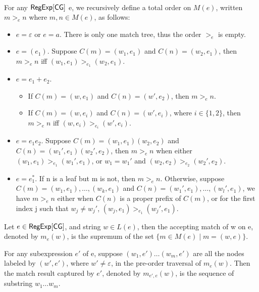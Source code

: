 \begin{definition}
	\
	
	For any ${\sf RegExp}[\sf CG]$ e, we recursively define a total order on $M (e)$, written $m
	>_e n$ where $m, n \in M (e)$, as follows:
	\begin{itemize}
		\item $e = \varepsilon$ or $e = a$. There is only one match tree, thus the
		order $>_e$ is empty.
		
		\item $e = (e_1)$. Suppose $C (m) = (w_1, e_1)$ and $C (n) = (w_2, e_1)$,
		then $m >_e n$ iff $(w_1, e_1) >_{e_1} (w_2, e_1)$.
		
		\item $e = e_1 + e_2$.
		\begin{itemize}
			\item If $C (m) = (w, e_1)$ and $C (n) = (w', e_2)$, then $m >_e n$.
			
			\item If $C (m) = (w, e_i)$ and $C (n) = (w', e_i)$, where $i \in \{ 1,
			2 \}$, then $m >_e n$ iff $(w, e_i) >_{e_i} (w', e_i)$.
		\end{itemize}
		\item $e = e_1 e_2$. Suppose $C (m) = (w_1, e_1) (w_2, e_2)$ and $C (n) =
		(w_1', e_1) (w_2', e_2)$, then $m >_e n$ when either $(w_1, e_1) >_{e_1}
		(w_1', e_1)$, or $w_1 = w_1'$ and $(w_2, e_2) >_{e_2} (w_2', e_2)$.
		
		\item $e = e_1^{\ast}$. If n is a leaf but m is not, then $m >_e n$.
		Otherwise, suppose $C (m) = (w_1, e_1), \ldots, (w_k, e_1)$ and $C (n) =
		(w_1', e_1), \ldots, (w_l', e_1)$, we have $m >_e n$ either when $C (n)$
		is a proper prefix of $C (m)$, or for the first index j such that $w_j
		\neq w_j'$, $(w_j, e_1) >_{e_1} (w_j', e_1)$.
	\end{itemize}
	
	Let $e \in {\sf RegExp}[\sf CG]$, and string $w \in L (e)$, then the accepting match of w
	on e, denoted by $m_e (w)$, is the supremum of the set $\{ m \in M (e) \mid m = (w, e) \}$.
	
	For any subexpression $e'$ of e, suppose $(w_1, e') \ldots (w_m, e')$ are
	all the nodes labeled by $(w', e')$, where $w' \neq \varepsilon$, in the
	pre-order traversal of $m_e (w)$. Then the match result captured by $e'$, denoted
	by $m_{e', e} (w)$, is the sequence of substring $w_1 \ldots w_m$.
\end{definition}

